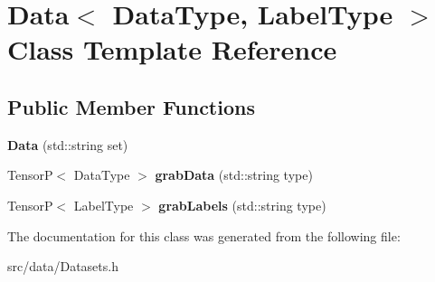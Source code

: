 \hypertarget{classData}{}\section{Data$<$ Data\+Type, Label\+Type $>$ Class Template Reference}
\label{classData}
\subsection*{Public Member Functions}
\begin{DoxyCompactItemize}
\item 
\mbox{\label{classData_a31b11247eb4d6bf3cff069ea5d5fa04b}} 
{\bfseries Data} (std\+::string set)
\item 
\mbox{\label{classData_a134973a2f111a6104ba26206a73c1f6c}} 
TensorP$<$ Data\+Type $>$ {\bfseries grab\+Data} (std\+::string type)
\item 
\mbox{\label{classData_abefa2813d1f699581768f0675767286d}} 
TensorP$<$ Label\+Type $>$ {\bfseries grab\+Labels} (std\+::string type)
\end{DoxyCompactItemize}


The documentation for this class was generated from the following file\+:\begin{DoxyCompactItemize}
\item 
src/data/Datasets.\+h\end{DoxyCompactItemize}
